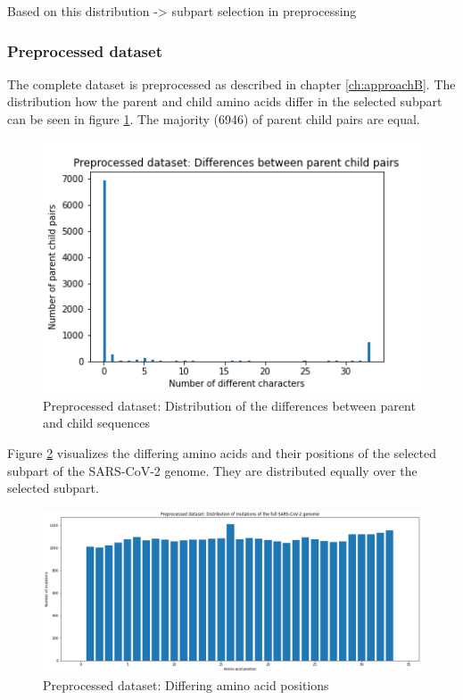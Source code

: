 Based on this distribution -> subpart selection in preprocessing


\subsubsection{Preprocessed dataset}  \label{ch:experimentsAb}

The complete dataset is preprocessed as described in chapter \ref{ch:approachB}.
The distribution how the parent and child amino acids differ in the selected subpart can be seen in figure \ref{preprocessedDistributionDifferencesParentChild}. The majority (6946) of parent child pairs are equal.

\begin{figure}[ht]
	\centering
	\includegraphics[width=0.7\linewidth]{figures/preprocessedDistributionDifferencesParentChild.png}
	\caption{Preprocessed dataset: Distribution of the differences between parent and child sequences \cite{own representation}}
	\label{preprocessedDistributionDifferencesParentChild}
\end{figure}

Figure \ref{preprocessedMutatedGeneticLoci} visualizes the differing amino acids and their positions of the selected subpart of the \ac{SARS-CoV-2} genome. They are distributed equally over the selected subpart.

\begin{figure}[ht]
	\centering
	\includegraphics[width=1.0\linewidth]{figures/preprocessedMutatedGeneticLoci.png}
	\caption{Preprocessed dataset: Differing amino acid positions \cite{own representation}}
	\label{preprocessedMutatedGeneticLoci}
\end{figure}

